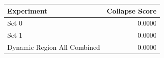 \begin{tabular}{lr}
\toprule
Experiment & Collapse Score \\
\midrule
Set 0 & 0.0000 \\
Set 1 & 0.0000 \\
Dynamic Region All Combined & 0.0000 \\
\bottomrule
\end{tabular}
